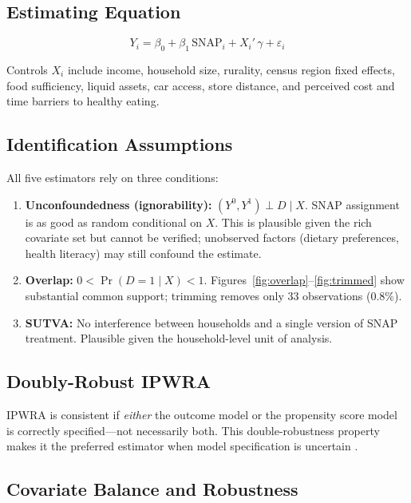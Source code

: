 \documentclass[12pt]{article}
\begin{document}
\subsection{Estimating Equation}

\begin{equation}
  Y_i = \beta_0 + \beta_1\,\text{SNAP}_i + X_i'\,\gamma + \varepsilon_i
  \label{eq:ols}
\end{equation}

Controls $X_i$ include income, household size, rurality, census
region fixed effects, food sufficiency, liquid assets, car access,
store distance, and perceived cost and time barriers to healthy eating.

\subsection{Identification Assumptions}

All five estimators rely on three conditions:

\begin{enumerate}
  \item \textbf{Unconfoundedness (ignorability):}
    $(Y^0,Y^1)\perp D\mid X$.
    SNAP assignment is as good as random conditional on $X$.
    This is plausible given the rich covariate set but cannot be
    verified; unobserved factors (dietary preferences, health
    literacy) may still confound the estimate.

  \item \textbf{Overlap:} $0 < \Pr(D=1\mid X) < 1$.
    Figures~\ref{fig:overlap}--\ref{fig:trimmed} show substantial
    common support; trimming removes only 33 observations (0.8\%).

  \item \textbf{SUTVA:} No interference between households and a
    single version of SNAP treatment. Plausible given the
    household-level unit of analysis.
\end{enumerate}

\subsection{Doubly-Robust IPWRA}

IPWRA is consistent if \emph{either} the outcome model or the
propensity score model is correctly specified---not necessarily both.
This double-robustness property makes it the preferred estimator
when model specification is uncertain \citep{bang2005}.

\subsection{Covariate Balance and Robustness}
\end{document}
